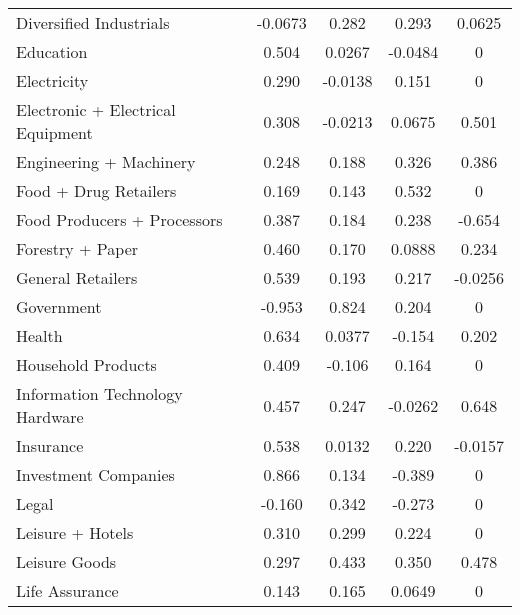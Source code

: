 {\begin{longtable}{l*{4}{c}}
Diversified Industrials&  -0.0673         &    0.282         &    0.293\sym{*}  &   0.0625         \\
Education       &    0.504\sym{*}  &   0.0267         &  -0.0484         &        0         \\
Electricity     &    0.290         &  -0.0138         &    0.151         &        0         \\
Electronic + Electrical Equipment&    0.308\sym{*}  &  -0.0213         &   0.0675         &    0.501\sym{*}  \\
Engineering + Machinery&    0.248         &    0.188         &    0.326\sym{**} &    0.386         \\
Food + Drug Retailers&    0.169         &    0.143         &    0.532\sym{***}&        0         \\
Food Producers + Processors&    0.387\sym{**} &    0.184         &    0.238         &   -0.654         \\
Forestry + Paper&    0.460         &    0.170         &   0.0888         &    0.234         \\
General Retailers&    0.539\sym{***}&    0.193         &    0.217         &  -0.0256         \\
Government      &   -0.953\sym{***}&    0.824\sym{***}&    0.204         &        0         \\
Health          &    0.634\sym{***}&   0.0377         &   -0.154         &    0.202         \\
Household Products&    0.409\sym{*}  &   -0.106         &    0.164         &        0         \\
Information Technology Hardware&    0.457\sym{**} &    0.247         &  -0.0262         &    0.648\sym{**} \\
Insurance       &    0.538\sym{***}&   0.0132         &    0.220         &  -0.0157         \\
Investment Companies&    0.866\sym{***}&    0.134         &   -0.389\sym{*}  &        0         \\
Legal           &   -0.160         &    0.342         &   -0.273         &        0         \\
Leisure + Hotels&    0.310\sym{*}  &    0.299         &    0.224         &        0         \\
Leisure Goods   &    0.297         &    0.433\sym{*}  &    0.350\sym{*}  &    0.478         \\
Life Assurance  &    0.143         &    0.165         &   0.0649         &        0         \\

\end{longtable}}
